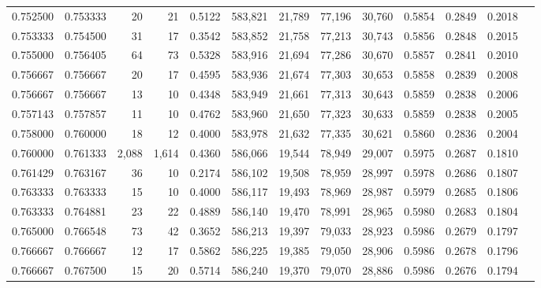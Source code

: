 \begin{tabular}{rrrrrrrrrrrrr}
0.752500 & 0.753333 &     20 &    21 &                                     0.5122 & 583,821 &  21,789 &  77,196 &  30,760 & 0.5854 & 0.2849 & 0.2018 \\
0.753333 & 0.754500 &     31 &    17 &                                     0.3542 & 583,852 &  21,758 &  77,213 &  30,743 & 0.5856 & 0.2848 & 0.2015 \\
0.755000 & 0.756405 &     64 &    73 &                                     0.5328 & 583,916 &  21,694 &  77,286 &  30,670 & 0.5857 & 0.2841 & 0.2010 \\
0.756667 & 0.756667 &     20 &    17 &                                     0.4595 & 583,936 &  21,674 &  77,303 &  30,653 & 0.5858 & 0.2839 & 0.2008 \\
0.756667 & 0.756667 &     13 &    10 &                                     0.4348 & 583,949 &  21,661 &  77,313 &  30,643 & 0.5859 & 0.2838 & 0.2006 \\
0.757143 & 0.757857 &     11 &    10 &                                     0.4762 & 583,960 &  21,650 &  77,323 &  30,633 & 0.5859 & 0.2838 & 0.2005 \\
0.758000 & 0.760000 &     18 &    12 &                                     0.4000 & 583,978 &  21,632 &  77,335 &  30,621 & 0.5860 & 0.2836 & 0.2004 \\
0.760000 & 0.761333 &  2,088 & 1,614 &                                     0.4360 & 586,066 &  19,544 &  78,949 &  29,007 & 0.5975 & 0.2687 & 0.1810 \\
0.761429 & 0.763167 &     36 &    10 &                                     0.2174 & 586,102 &  19,508 &  78,959 &  28,997 & 0.5978 & 0.2686 & 0.1807 \\
0.763333 & 0.763333 &     15 &    10 &                                     0.4000 & 586,117 &  19,493 &  78,969 &  28,987 & 0.5979 & 0.2685 & 0.1806 \\
0.763333 & 0.764881 &     23 &    22 &                                     0.4889 & 586,140 &  19,470 &  78,991 &  28,965 & 0.5980 & 0.2683 & 0.1804 \\
0.765000 & 0.766548 &     73 &    42 &                                     0.3652 & 586,213 &  19,397 &  79,033 &  28,923 & 0.5986 & 0.2679 & 0.1797 \\
0.766667 & 0.766667 &     12 &    17 &                                     0.5862 & 586,225 &  19,385 &  79,050 &  28,906 & 0.5986 & 0.2678 & 0.1796 \\
0.766667 & 0.767500 &     15 &    20 &                                     0.5714 & 586,240 &  19,370 &  79,070 &  28,886 & 0.5986 & 0.2676 & 0.1794 \\

\end{tabular}
